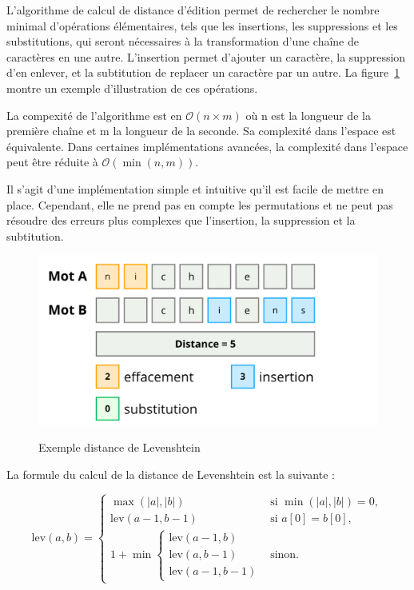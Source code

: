 \documentclass[a4paper, 11pt]{report}
\begin{document}
L'algorithme de calcul de distance d'édition permet de rechercher le nombre minimal d'opérations élémentaires, tels que les insertions, les suppressions et les substitutions, qui seront nécessaires à la transformation d'une chaîne de caractères en une autre. L'insertion permet d'ajouter un caractère, la suppression d'en enlever, et la subtitution de replacer un caractère par un autre. La figure~\ref{fig:levenshtein} montre un exemple d'illustration de ces opérations. \par \vspace{\baselineskip}

La compexité de l'algorithme est en $\mathcal{O}(n \times m)$  où n est la longueur de la première chaîne et m la longueur de la seconde. Sa complexité dans l'espace est équivalente. Dans certaines implémentations avancées, la complexité dans l'espace peut être réduite à $\mathcal{O}(\min(n,m))$. \par \vspace{\baselineskip}

Il s'agit d'une implémentation simple et intuitive qu'il est facile de mettre en place. Cependant, elle ne prend pas en compte les permutations et ne peut pas résoudre des erreurs plus complexes que l'insertion, la suppression et la subtitution.


\begin{figure}[H]
	\begin{center}
		{\includegraphics[height=0.45\textwidth]{images/levenshtein.png}}
	\end{center}
	\caption{Exemple distance de Levenshtein}
	\label{fig:levenshtein}
\end{figure}

\noindent{}La formule du calcul de la distance de Levenshtein est la suivante :

\[
	\text{lev}(a, b) =
	\begin{cases}
		\max(|a|, |b|)           & \text{si } \min(|a|, |b|) = 0, \\
		\text{lev}(a - 1, b - 1) & \text{si } a[0] = b[0],        \\
		1 + \min \begin{cases}
			         \text{lev}(a - 1, b) \\
			         \text{lev}(a, b - 1) \\
			         \text{lev}(a - 1, b - 1)
		         \end{cases} & \text{sinon}.
	\end{cases}
\]
\end{document}
